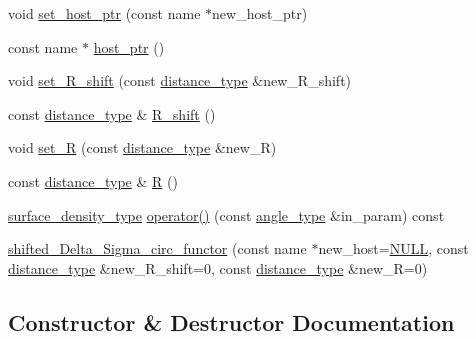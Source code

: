 \begin{DoxyCompactItemize}
\item 
void \hyperlink{classIceBRG_1_1shifted__Delta__Sigma__circ__functor_aa1117aedc52287f70d3f796509ec0817}{set\+\_\+host\+\_\+ptr} (const name $\ast$new\+\_\+host\+\_\+ptr)
\item 
const name $\ast$ \hyperlink{classIceBRG_1_1shifted__Delta__Sigma__circ__functor_a18ef46f183c85ad06c222ddd101cedf2}{host\+\_\+ptr} ()
\item 
void \hyperlink{classIceBRG_1_1shifted__Delta__Sigma__circ__functor_a907c0e414ca0f9b9bf189382c2cd6ed5}{set\+\_\+\+R\+\_\+shift} (const \hyperlink{namespaceIceBRG_a45499647eb87e24c10ab32c628711cec}{distance\+\_\+type} \&new\+\_\+\+R\+\_\+shift)
\item 
const \hyperlink{namespaceIceBRG_a45499647eb87e24c10ab32c628711cec}{distance\+\_\+type} \& \hyperlink{classIceBRG_1_1shifted__Delta__Sigma__circ__functor_aefc2f32724d679232d602655626fbf86}{R\+\_\+shift} ()
\item 
void \hyperlink{classIceBRG_1_1shifted__Delta__Sigma__circ__functor_ac612029c9d4ac39c5b2a30fb0b3a81a4}{set\+\_\+\+R} (const \hyperlink{namespaceIceBRG_a45499647eb87e24c10ab32c628711cec}{distance\+\_\+type} \&new\+\_\+\+R)
\item 
const \hyperlink{namespaceIceBRG_a45499647eb87e24c10ab32c628711cec}{distance\+\_\+type} \& \hyperlink{classIceBRG_1_1shifted__Delta__Sigma__circ__functor_a2d4c8d7d12a07a3a29c3778b9a764e08}{R} ()
\item 
\hyperlink{namespaceIceBRG_a80c597ef5ba0a32491d32a9f0083b02d}{surface\+\_\+density\+\_\+type} \hyperlink{classIceBRG_1_1shifted__Delta__Sigma__circ__functor_a73db85ee276a18beca470f655e021e79}{operator()} (const \hyperlink{namespaceIceBRG_a688eeb0811a2474b20b667ed2e9625a1}{angle\+\_\+type} \&in\+\_\+param) const 
\item 
\hyperlink{classIceBRG_1_1shifted__Delta__Sigma__circ__functor_a74b4bb7c374c036239d4fa180d9a4661}{shifted\+\_\+\+Delta\+\_\+\+Sigma\+\_\+circ\+\_\+functor} (const name $\ast$new\+\_\+host=\hyperlink{lib_2IceBRG__main_2common_8h_a070d2ce7b6bb7e5c05602aa8c308d0c4}{N\+U\+L\+L}, const \hyperlink{namespaceIceBRG_a45499647eb87e24c10ab32c628711cec}{distance\+\_\+type} \&new\+\_\+\+R\+\_\+shift=0, const \hyperlink{namespaceIceBRG_a45499647eb87e24c10ab32c628711cec}{distance\+\_\+type} \&new\+\_\+\+R=0)
\end{DoxyCompactItemize}


\subsection{Constructor \& Destructor Documentation}
\hypertarget{classIceBRG_1_1shifted__Delta__Sigma__circ__functor_a74b4bb7c374c036239d4fa180d9a4661}{}
